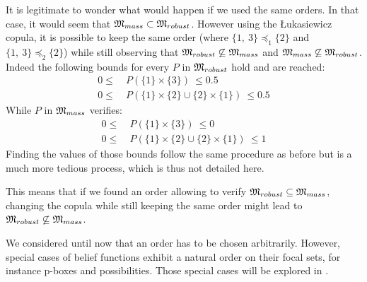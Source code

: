 \begin{example}
\begin{remark}
        It is legitimate to wonder what would happen if we used the same orders. In that case, it would seem that $\mathfrak{M}_{mass}\subset\mathfrak{M}_{robust}$. However using the \L ukasiewicz copula, it is possible to keep the same order (where $\{1,~3\} \preceq_1 \{2\}$ and $\{1,~3\} \preceq_2 \{2\}$) while still observing that $\mathfrak{M}_{robust}\not\subseteq \mathfrak{M}_{mass}$ and $\mathfrak{M}_{mass}\not\subseteq \mathfrak{M}_{robust}$. Indeed the following bounds for every $P$ in $\mathfrak{M}_{robust}$ hold and are reached:
        \begin{align*}
            0 \leqslant ~&P(\{1\}\times\{3\})~ \leqslant 0.5\\
            0 \leqslant ~&P(\{1\}\times\{2\}\cup\{2\}\times\{1\})~ \leqslant 0.5
        \end{align*}
        While $P$ in $\mathfrak{M}_{mass}$ verifies:
        \begin{align*}
            0 \leqslant ~&P(\{1\}\times\{3\})~ \leqslant 0\\
            0 \leqslant ~&P(\{1\}\times\{2\}\cup\{2\}\times\{1\})~ \leqslant 1
        \end{align*}
        Finding the values of those bounds follow the same procedure as before but is a much more tedious process, which is thus not detailed here. 
        
        This means that if we found an order allowing to verify $\mathfrak{M}_{robust}\subseteq \mathfrak{M}_{mass}$, changing the copula while still keeping the same order might lead to $\mathfrak{M}_{robust}\not\subseteq \mathfrak{M}_{mass}$.
    \end{remark}
\end{example}

We considered until now that an order has to be chosen arbitrarily. However, special cases of belief functions exhibit a natural order on their focal sets, for instance p-boxes and possibilities. Those special cases will be explored in .

